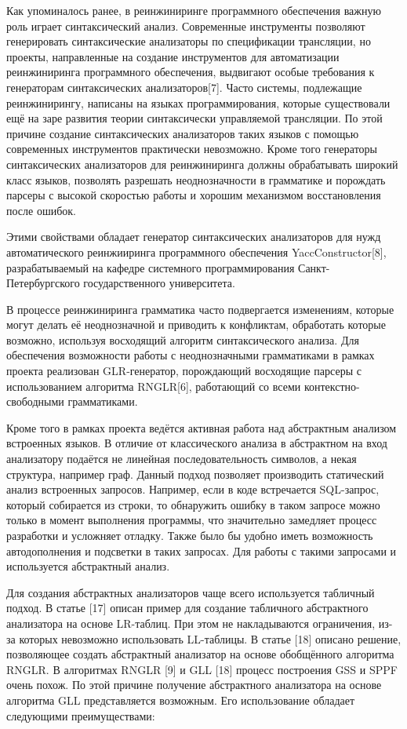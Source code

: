 \documentclass{matmex-diploma-custom}
\begin{document}
Как упоминалось ранее, в реинжиниринге программного обеспечения важную роль играет синтаксический анализ. Современные инструменты позволяют генерировать синтаксические анализаторы по спецификации трансляции, но проекты, направленные на создание инструментов для автоматизации реинжиниринга программного обеспечения, выдвигают особые требования к генераторам синтаксических анализаторов[7]. Часто системы, подлежащие реинжинирингу, написаны на языках программирования, которые существовали ещё на заре развития теории синтаксически управляемой трансляции. По этой причине создание синтаксических анализаторов таких языков с помощью современных инструментов практически невозможно. Кроме того генераторы синтаксических анализаторов для реинжиниринга должны обрабатывать широкий класс языков, позволять разрешать неоднозначности в грамматике и порождать парсеры с высокой скоростью работы и хорошим механизмом восстановления после ошибок.

Этими свойствами обладает генератор синтаксических анализаторов для нужд автоматического реинжииринга программного обеспечения YaccConstructor[8], разрабатываемый на кафедре системного программирования Санкт-Петербургского государственного университета.

В процессе реинжиниринга грамматика часто подвергается изменениям, которые могут делать её неоднозначной и приводить к конфликтам, обработать которые возможно, используя восходящий алгоритм синтаксического анализа. Для обеспечения возможности работы с неоднозначными грамматиками в рамках проекта реализован GLR-генератор, порождающий восходящие парсеры с использованием алгоритма RNGLR[6], работающий со всеми контекстно-свободными грамматиками.

Кроме того в рамках проекта ведётся активная работа над абстрактным анализом встроенных языков. В отличие от классического анализа в абстрактном на вход анализатору подаётся не линейная последовательность символов, а некая структура, например граф. Данный подход позволяет производить статический анализ встроенных запросов. Например, если в коде встречается SQL-запрос, который собирается из строки, то обнаружить ошибку в таком запросе можно только в момент выполнения программы, что значительно замедляет процесс разработки и усложняет отладку. Также было бы удобно иметь возможность автодополнения и подсветки в таких запросах. Для работы с такими запросами и используется абстрактный анализ. 


Для создания абстрактных анализаторов чаще всего используется табличный подход. В статье [17] описан пример для создание табличного абстрактного анализатора на основе LR-таблиц. При этом не накладываются ограничения, из-за которых невозможно использовать LL-таблицы. В статье [18] описано решение, позволяющее создать абстрактный анализатор на основе обобщённого алгоритма RNGLR. В алгоритмах RNGLR [9] и GLL [18] процесс построения GSS и SPPF очень похож. По этой причине получение абстрактного анализатора на основе алгоритма GLL  представляется возможным. Его использование обладает следующими преимуществами:
\end{document}
